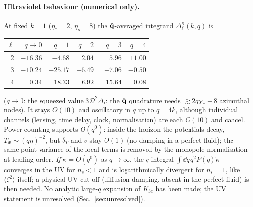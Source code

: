 \paragraph{Ultraviolet behaviour (numerical only).}  At fixed $k=1$ ($\eta_*=2$, $\eta_o=8$) the $\hat{\mathbf q}$-averaged integrand
$\Delta^{\tilde\kappa}_\ell(k,q)$ is
\begin{center}\footnotesize
\begin{tabular}{r|rrrrr}
\hline
$\ell$ & $q\to0$ & $q=1$ & $q=2$ & $q=3$ & $q=4$\\ \hline
2 & $-16.36$ & $-4.68$ & $2.04$ & $5.96$ & $11.00$\\
3 & $-10.24$ & $-25.17$ & $-5.49$ & $-7.06$ & $-0.50$\\
4 & $0.34$ & $-18.33$ & $-6.92$ & $-15.64$ & $-0.08$\\ \hline
\end{tabular}
\end{center}
($q\to0$: the squeezed value $3\mathcal D^2\Delta_\ell$; the $\hat{\mathbf q}$ quadrature needs $\gtrsim2q\chi_*+8$ azimuthal nodes).  It stays $O(10)$ and
oscillatory in $q$ up to $q=4k$, although individual channels (lensing, time delay, clock, normalisation) are each $O(10)$ and cancel.
Power counting supports $O(q^0)$: inside the horizon the potentials decay, $T_\Phi\sim(q\eta)^{-2}$, but $\delta_T$ and $v$ stay $O(1)$ (no
damping in a perfect fluid); the same-point variance of the local terms is removed by the monopole normalisation at leading order.  \emph{If}
$\tilde\kappa=O(q^0)$ as $q\to\infty$, the $q$ integral $\int\dd q\,q^2P(q)\tilde\kappa$ converges in the UV for $n_s<1$ and is logarithmically
divergent for $n_s=1$, like $\langle\zeta^2\rangle$ itself; a physical UV cut-off (diffusion damping, absent in the perfect fluid) is then needed.
No analytic large-$q$ expansion of $K_{3c}$ has been made; the UV statement is unresolved (Sec.~\ref{sec:unresolved}).
